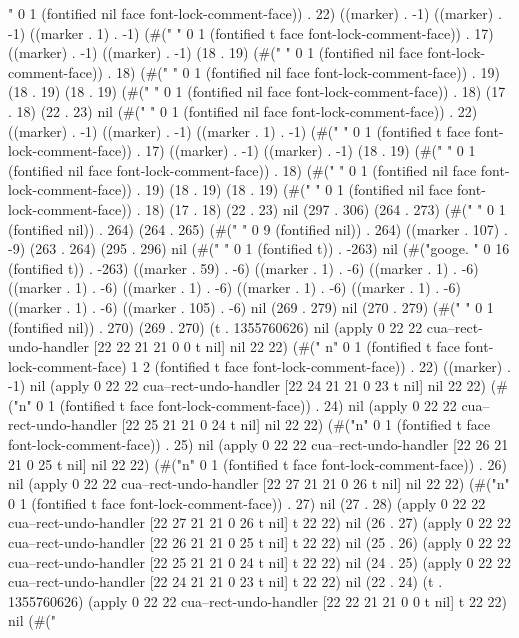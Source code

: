 {" 0 1 (fontified nil face font-lock-comment-face)) . 22) ((marker) . -1) ((marker) . -1) ((marker . 1) . -1) (#("
" 0 1 (fontified t face font-lock-comment-face)) . 17) ((marker) . -1) ((marker) . -1) (18 . 19) (#("
" 0 1 (fontified nil face font-lock-comment-face)) . 18) (#("%
" 0 1 (fontified nil face font-lock-comment-face)) . 19) (18 . 19) (18 . 19) (#(" " 0 1 (fontified nil face font-lock-comment-face)) . 18) (17 . 18) (22 . 23) nil (#("
" 0 1 (fontified nil face font-lock-comment-face)) . 22) ((marker) . -1) ((marker) . -1) ((marker . 1) . -1) (#("
" 0 1 (fontified t face font-lock-comment-face)) . 17) ((marker) . -1) ((marker) . -1) (18 . 19) (#("
" 0 1 (fontified nil face font-lock-comment-face)) . 18) (#("%
" 0 1 (fontified nil face font-lock-comment-face)) . 19) (18 . 19) (18 . 19) (#(" " 0 1 (fontified nil face font-lock-comment-face)) . 18) (17 . 18) (22 . 23) nil (297 . 306) (264 . 273) (#(" " 0 1 (fontified nil)) . 264) (264 . 265) (#("         " 0 9 (fontified nil)) . 264) ((marker . 107) . -9) (263 . 264) (295 . 296) nil (#("
" 0 1 (fontified t)) . -263) nil (#("googe.
         " 0 16 (fontified t)) . -263) ((marker . 59) . -6) ((marker . 1) . -6) ((marker . 1) . -6) ((marker . 1) . -6) ((marker . 1) . -6) ((marker . 1) . -6) ((marker . 1) . -6) ((marker . 1) . -6) ((marker . 105) . -6) nil (269 . 279) nil (270 . 279) (#(" " 0 1 (fontified nil)) . 270) (269 . 270) (t . 1355760626) nil (apply 0 22 22 cua--rect-undo-handler [22 22 21 21 0 0 t nil] nil 22 22) (#(" n" 0 1 (fontified t face font-lock-comment-face) 1 2 (fontified t face font-lock-comment-face)) . 22) ((marker) . -1) nil (apply 0 22 22 cua--rect-undo-handler [22 24 21 21 0 23 t nil] nil 22 22) (#("n" 0 1 (fontified t face font-lock-comment-face)) . 24) nil (apply 0 22 22 cua--rect-undo-handler [22 25 21 21 0 24 t nil] nil 22 22) (#("n" 0 1 (fontified t face font-lock-comment-face)) . 25) nil (apply 0 22 22 cua--rect-undo-handler [22 26 21 21 0 25 t nil] nil 22 22) (#("n" 0 1 (fontified t face font-lock-comment-face)) . 26) nil (apply 0 22 22 cua--rect-undo-handler [22 27 21 21 0 26 t nil] nil 22 22) (#("n" 0 1 (fontified t face font-lock-comment-face)) . 27) nil (27 . 28) (apply 0 22 22 cua--rect-undo-handler [22 27 21 21 0 26 t nil] t 22 22) nil (26 . 27) (apply 0 22 22 cua--rect-undo-handler [22 26 21 21 0 25 t nil] t 22 22) nil (25 . 26) (apply 0 22 22 cua--rect-undo-handler [22 25 21 21 0 24 t nil] t 22 22) nil (24 . 25) (apply 0 22 22 cua--rect-undo-handler [22 24 21 21 0 23 t nil] t 22 22) nil (22 . 24) (t . 1355760626) (apply 0 22 22 cua--rect-undo-handler [22 22 21 21 0 0 t nil] t 22 22) nil (#("
}

